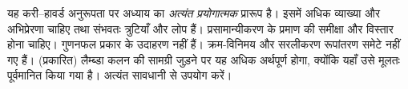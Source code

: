 \documentclass[../../../include/open-logic-chapter]{subfiles}
\begin{document}

\begin{editorial}
  यह करी--हावर्ड अनुरूपता पर अध्याय का \emph{अत्यंत प्रयोगात्मक} प्रारूप है।
  इसमें अधिक व्याख्या और अभिप्रेरणा चाहिए तथा संभवतः त्रुटियाँ और लोप हैं।
  प्रसामान्यीकरण के प्रमाण की समीक्षा और विस्तार होना चाहिए। गुणनफल प्रकार के
  उदाहरण नहीं हैं। क्रम-विनिमय और सरलीकरण रूपांतरण समेटे नहीं गए हैं। (प्रकारित)
  लैम्ब्डा कलन की सामग्री जुड़ने पर यह अधिक अर्थपूर्ण होगा, क्योंकि यहाँ उसे
  मूलतः पूर्वमानित किया गया है। अत्यंत सावधानी से उपयोग करें।
\end{editorial}


\OLEndChapterHook
\end{document}
